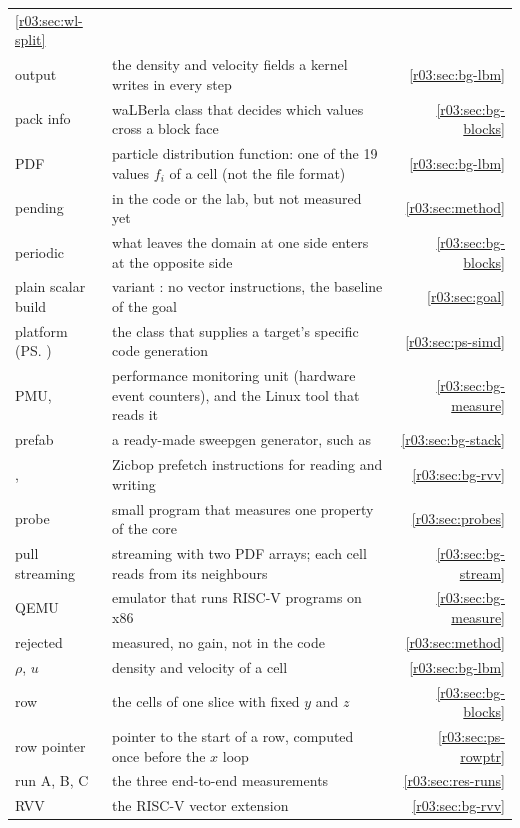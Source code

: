\begin{xltabular}{\linewidth}{@{}>{\raggedright\arraybackslash}p{3.6cm}>{\raggedright\arraybackslash}Xr@{}}
    \ref{r03:sec:wl-split}\\
  output & the density and velocity fields a kernel writes in every step & \ref{r03:sec:bg-lbm}\\
  pack info & waLBerla class that decides which values cross a block face & \ref{r03:sec:bg-blocks}\\
  PDF & particle distribution function: one of the 19 values $f_i$ of a cell (not the file
    format) & \ref{r03:sec:bg-lbm}\\
  pending & in the code or the lab, but not measured yet & \ref{r03:sec:method}\\
  periodic & what leaves the domain at one side enters at the opposite side & \ref{r03:sec:bg-blocks}\\
  plain scalar build & variant : no vector instructions, the baseline of the goal &
    \ref{r03:sec:goal}\\
  platform (\ps{}) & the class that supplies a target's specific code generation &
    \ref{r03:sec:ps-simd}\\
  PMU,  & performance monitoring unit (hardware event counters), and the Linux tool that
    reads it & \ref{r03:sec:bg-measure}\\
  prefab & a ready-made sweepgen generator, such as  & \ref{r03:sec:bg-stack}\\
  ,  & Zicbop prefetch instructions for reading and writing &
    \ref{r03:sec:bg-rvv}\\
  probe & small program that measures one property of the core & \ref{r03:sec:probes}\\
  pull streaming & streaming with two PDF arrays; each cell reads from its neighbours &
    \ref{r03:sec:bg-stream}\\
  QEMU & emulator that runs RISC-V programs on x86 & \ref{r03:sec:bg-measure}\\
  rejected & measured, no gain, not in the code & \ref{r03:sec:method}\\
  $\rho$, $u$ & density and velocity of a cell & \ref{r03:sec:bg-lbm}\\
  row & the cells of one slice with fixed $y$ and $z$ & \ref{r03:sec:bg-blocks}\\
  row pointer & pointer to the start of a row, computed once before the $x$ loop &
    \ref{r03:sec:ps-rowptr}\\
  run A, B, C & the three end-to-end measurements & \ref{r03:sec:res-runs}\\
  RVV & the RISC-V vector extension & \ref{r03:sec:bg-rvv}\\

\end{xltabular}
